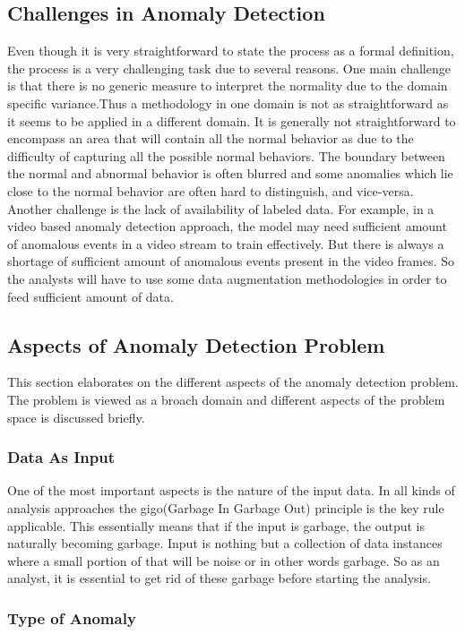 \documentclass[a4paper,12pt]{report}
\begin{document}
\subsection{Challenges in Anomaly Detection}
Even though it is very straightforward to state the process as a formal definition, the process is a very challenging task due to several reasons. One main challenge is that there is no generic measure to interpret the normality due to the domain specific variance.Thus a methodology in one domain is not as straightforward as it seems to be applied in a different domain. It is generally not straightforward to encompass an area that will contain all the normal behavior as due to the difficulty of capturing all the possible normal behaviors. The boundary between the normal and abnormal behavior is often blurred and some anomalies which lie close to the normal behavior are often hard to distinguish, and vice-versa. Another challenge is the lack of availability of labeled data. For example, in a video based anomaly detection approach, the model may need sufficient amount of anomalous events in a video stream to train effectively.  But there is always a shortage of sufficient amount of anomalous events present in the video frames. So the analysts will have to use some data augmentation methodologies in order to feed sufficient amount of data. 


\subsection{Aspects of Anomaly Detection Problem}
This section elaborates on the different aspects of the anomaly detection problem. The problem is viewed as a broach domain and different aspects of the problem space is discussed briefly.

\subsubsection{Data As Input}
One of the most important aspects is the nature of the input data. In all kinds of analysis approaches the \gls{gigo}(Garbage In Garbage Out) principle is the key rule applicable. This essentially means that if the input is garbage, the output is naturally becoming garbage.  Input is nothing but a collection of data instances where a small portion of that will be noise or in other words garbage. So as an analyst, it is essential to get rid of these garbage before starting the analysis. 

\subsubsection{Type of Anomaly}
\end{document}
